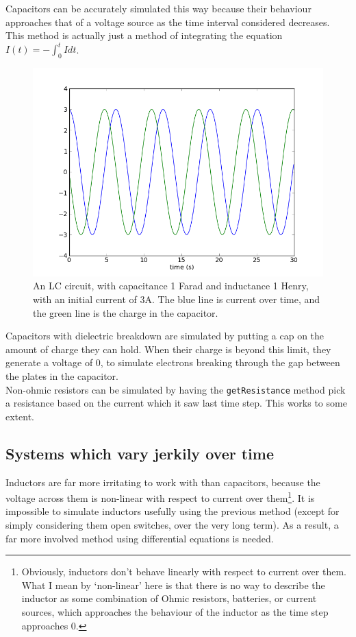 \documentclass[11pt]{article}
\begin{document}
Capacitors can be accurately simulated this way because their behaviour approaches that of a voltage source as the time interval considered decreases. This method is actually just a method of integrating the equation $I(t)=-\int_0^t I dt$.\\

\begin{figure}
 \includegraphics[scale=0.5]{LC_circuit.png}
\caption{An LC circuit, with capacitance 1 Farad and inductance 1 Henry, with an initial current of 3A. The blue line is current over time, and the green line is the charge in the capacitor.}
\end{figure}

Capacitors with dielectric breakdown are simulated by putting a cap on the amount of charge they can hold. When their charge is beyond this limit, they generate a voltage of 0, to simulate electrons breaking through the gap between the plates in the capacitor.\\

Non-ohmic resistors can be simulated by having the \texttt{getResistance} method pick a resistance based on the current which it saw last time step. This works to some extent.\\

\subsection*{Systems which vary jerkily over time}

Inductors are far more irritating to work with than capacitors, because the voltage across them is non-linear with respect to current over them\footnote{Obviously, inductors don't behave linearly with respect to current over them. What I mean by `non-linear' here is that there is no way to describe the inductor as some combination of Ohmic resistors, batteries, or current sources, which approaches the behaviour of the inductor as the time step approaches 0.}. It is impossible to simulate inductors usefully using the previous method (except for simply considering them open switches, over the very long term). As a result, a far more involved method using differential equations is needed.\\
\end{document}
